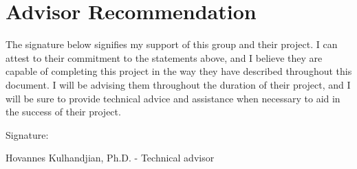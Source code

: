 \documentclass[10pt,onecolumn,draftcls]{IEEEtran} 					%
\begin{document}
	\section{Advisor Recommendation}
	The signature below signifies my support of this group and their project. I can attest to their commitment to the statements above, and I believe they are capable of completing this project in the way they have described throughout this document. I will be advising them throughout the duration of their project, and I will be sure to provide technical advice and assistance when necessary to aid in the success of their project.\\
	
	\begin{flushleft}
		
	Signature: \hrulefill
	
	\hspace*{0mm}\phantom{Approved: }Hovannes Kulhandjian, Ph.D. - Technical advisor\\\

\end{flushleft}
\end{document}
